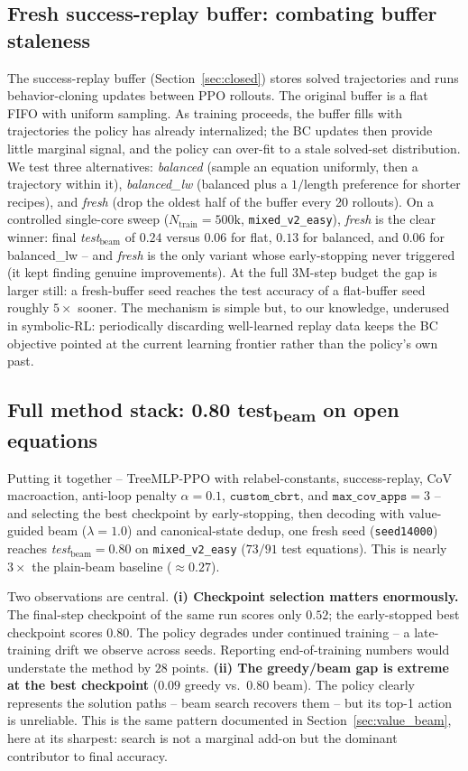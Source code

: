 \documentclass{article}
\theoremstyle{plain}
\theoremstyle{definition}
\theoremstyle{remark}
\begin{document}
\subsection{Fresh success-replay buffer: combating buffer staleness}
\label{sec:fresh_buffer}
The success-replay buffer (Section~\ref{sec:closed}) stores solved trajectories and runs behavior-cloning updates between PPO rollouts. The original buffer is a flat FIFO with uniform sampling. As training proceeds, the buffer fills with trajectories the policy has already internalized; the BC updates then provide little marginal signal, and the policy can over-fit to a stale solved-set distribution. We test three alternatives: \emph{balanced} (sample an equation uniformly, then a trajectory within it), \emph{balanced\_lw} (balanced plus a $1/\text{length}$ preference for shorter recipes), and \emph{fresh} (drop the oldest half of the buffer every 20 rollouts). On a controlled single-core sweep ($N_{\text{train}} = 500\text{k}$, \texttt{mixed\_v2\_easy}), \emph{fresh} is the clear winner: final \textit{test}$_{\text{beam}}$ of $0.24$ versus $0.06$ for flat, $0.13$ for balanced, and $0.06$ for balanced\_lw -- and \emph{fresh} is the only variant whose early-stopping never triggered (it kept finding genuine improvements). At the full $3\text{M}$-step budget the gap is larger still: a fresh-buffer seed reaches the test accuracy of a flat-buffer seed roughly $5\times$ sooner. The mechanism is simple but, to our knowledge, underused in symbolic-RL: periodically discarding well-learned replay data keeps the BC objective pointed at the current learning frontier rather than the policy's own past.

\subsection{Full method stack: 0.80 test\textsubscript{beam} on open equations}
\label{sec:full_stack}
Putting it together -- TreeMLP-PPO with relabel-constants, success-replay, CoV macroaction, anti-loop penalty $\alpha = 0.1$, $\texttt{custom\_cbrt}$, and $\texttt{max\_cov\_apps}=3$ -- and selecting the best checkpoint by early-stopping, then decoding with value-guided beam ($\lambda = 1.0$) and canonical-state dedup, one fresh seed (\texttt{seed14000}) reaches \textit{test}$_{\text{beam}} = \mathbf{0.80}$ on \texttt{mixed\_v2\_easy} ($73/91$ test equations). This is nearly $3\times$ the plain-beam baseline ($\approx 0.27$).

Two observations are central. \textbf{(i) Checkpoint selection matters enormously.} The final-step checkpoint of the same run scores only $0.52$; the early-stopped best checkpoint scores $0.80$. The policy degrades under continued training -- a late-training drift we observe across seeds. Reporting end-of-training numbers would understate the method by $28$ points. \textbf{(ii) The greedy/beam gap is extreme at the best checkpoint} ($0.09$ greedy vs.\ $0.80$ beam). The policy clearly represents the solution paths -- beam search recovers them -- but its top-1 action is unreliable. This is the same pattern documented in Section~\ref{sec:value_beam}, here at its sharpest: search is not a marginal add-on but the dominant contributor to final accuracy.
\end{document}
